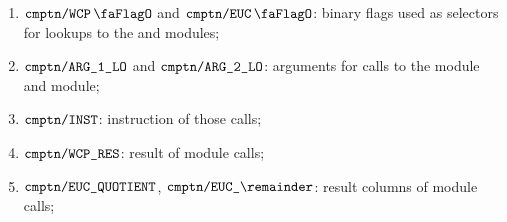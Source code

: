 \begin{enumerate}
	\item $\txnDataCmptnWcpFlag$ and $\txnDataCmptnEucFlag$:
		binary flags used as selectors for lookups
		to the \wcpMod{} and \eucMod{} modules;
	\item $\texttt{cmptn}\texttt{/}{\texttt{\texttt{ARG}\texttt{\_1}\texttt{\_LO}}}$ and $\texttt{cmptn}\texttt{/}{\texttt{\texttt{ARG}\texttt{\_2}\texttt{\_LO}}}$:
		arguments for calls to the \wcpMod{} module and \eucMod{} module;
	\item $\texttt{cmptn}\texttt{/}{\texttt{\texttt{INST}}}$:
		instruction of those calls;
	\item $\texttt{cmptn}\texttt{/}{\texttt{WCP\_\texttt{RES}}}$:
		result of \wcpMod{} module calls;
	\item $\texttt{cmptn}\texttt{/}{\texttt{EUC\_\texttt{QUOTIENT}}}$, $\txnDataCmptnEucRemainder$:
		result columns of \eucMod{} module calls;
\end{enumerate}

